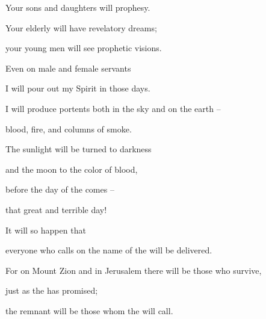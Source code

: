 {\par }{\Q Your sons
and daughters
will prophesy.
\par }{\Q Your elderly
will have revelatory
dreams;
\par }{\Q your young men
will see
prophetic visions.
\par }{\Q {}Even
on
male and female
servants
\par }{\Q I will pour
out my Spirit
in those
days.
\par }{\Q {}I will produce
portents
both in the sky
and on the earth
–
\par }{\Q blood,
fire,
and columns
of smoke.
\par }{\Q {}The sunlight
will be turned
to darkness
\par }{\Q and the moon
to the color of blood,
\par }{\Q before
the day
of the {}
comes
–
\par }{\Q that great
and terrible day!
\par }{\Q {}It will so happen
that
\par }{\Q everyone
who
calls
on the name
of the {}
will
be delivered.
\par }{\Q For
on Mount
Zion
and in Jerusalem
there will be
those who survive,
\par }{\Q just
as the
{}
has
promised;
\par }{\Q the remnant
will be those whom
the {}
will call.

\par }
